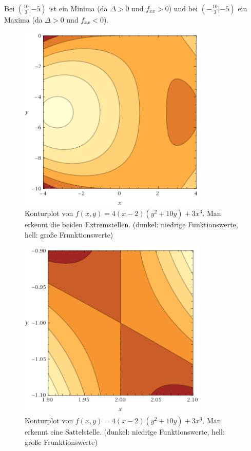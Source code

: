 Bei $(\frac{10}{3}|-5)$ ist ein Minima (da $\Delta > 0$ und $f_{xx} > 0$) und bei $(-\frac{10}{3}|-5)$ ein Maxima (da $\Delta > 0$ und $f_{xx} < 0$).

\begin{figure}[ht]
  \centering
  \includegraphics[width=0.8\textwidth]{../pool/ex-fn-extrema-6-img-c.png}
  \caption{Konturplot von $f(x,y) = 4(x-2)(y^2+10y)+3x^3$. Man erkennt die beiden Extremstellen. (dunkel: niedrige Funktionswerte, hell: große Frunktionswerte)}
  \label{ex-fn-extrema-6-img-c}
\end{figure}

\begin{figure}[ht]
  \centering
  \includegraphics[width=0.8\textwidth]{../pool/ex-fn-extrema-6-img-d.png}
  \caption{Konturplot von $f(x,y) = 4(x-2)(y^2+10y)+3x^3$. Man erkennt eine Sattelstelle. (dunkel: niedrige Funktionswerte, hell: große Frunktionswerte)}
  \label{ex-fn-extrema-6-img-d}
\end{figure}

